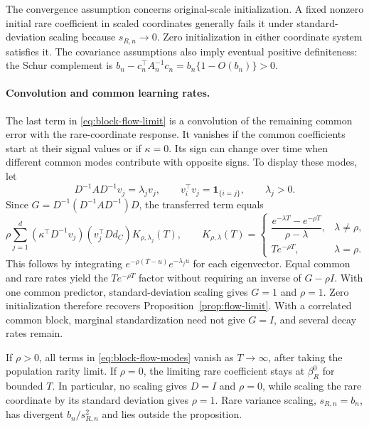 The convergence assumption concerns original-scale initialization. A fixed
nonzero initial rare coefficient in scaled coordinates generally fails it under
standard-deviation scaling because $s_{R,n} \to 0$. Zero initialization in
either coordinate system satisfies it. The covariance assumptions also imply
eventual positive definiteness: the Schur complement is
$b_n - c_n^\top A_n^{-1}c_n = b_n\{1 - O(b_n)\} > 0$.

\paragraph{Convolution and common learning rates.}

The last term in \eqref{eq:block-flow-limit} is a convolution of the remaining
common error with the rare-coordinate response. It vanishes if the common
coefficients start at their signal values or if $\kappa = 0$. Its sign can
change over time when different common modes contribute with opposite signs. To
display these modes, let
\[
 D^{-1}AD^{-1}v_j = \lambda_jv_j,\qquad v_i^\top v_j
                  = \mathbf{1}_{\{i=j\}},\qquad \lambda_j
                  > 0.
\]
Since $G = D^{-1}(D^{-1}AD^{-1})D$, the transferred term equals
\begin{equation}
 \label{eq:block-flow-modes}
 \rho\sum_{j=1}^d (\kappa^\top D^{-1}v_j)(v_j^\top Dd_C)K_{\rho,\lambda_j}(T), \qquad K_{\rho,\lambda}(T)
 = \begin{cases}
    \dfrac{e^{-\lambda T}-e^{-\rho T}}{\rho-\lambda}, & \lambda \ne \rho, \\[6pt]
    T e^{-\rho T},                                    & \lambda = \rho.
   \end{cases}
\end{equation}
This follows by integrating $e^{-\rho(T-u)}e^{-\lambda_j u}$ for each
eigenvector. Equal common and rare rates yield the $T e^{-\rho T}$ factor
without requiring an inverse of $G - \rho I$. With one common predictor,
standard-deviation scaling gives $G = 1$ and $\rho = 1$. Zero initialization
therefore recovers Proposition~\ref{prop:flow-limit}. With a correlated common
block, marginal standardization need not give $G = I$, and several decay rates
remain.

If $\rho > 0$, all terms in \eqref{eq:block-flow-modes} vanish as
$T \to \infty$, after taking the population rarity limit. If $\rho = 0$, the
limiting rare coefficient stays at $\beta_R^0$ for bounded $T$. In particular,
no scaling gives $D = I$ and $\rho = 0$, while scaling the rare coordinate by
its standard deviation gives $\rho = 1$. Rare variance scaling, $s_{R,n} = b_n$,
has divergent $b_n/s_{R,n}^2$ and lies outside the proposition.

